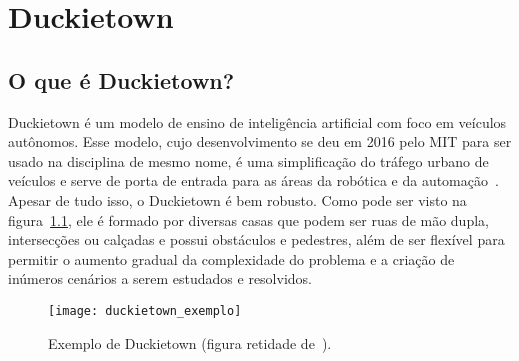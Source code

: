 

\chapter{Duckietown}
\label{cap:duckietown}

\section{O que é Duckietown?}
\label{sec:o-que-e-duckietown}

\enlargethispage{.5\baselineskip}

Duckietown é um modelo de ensino de inteligência artificial com foco em veículos autônomos. Esse modelo, cujo desenvolvimento se deu em 2016 pelo MIT para ser usado na disciplina de mesmo nome, é uma simplificação do tráfego urbano de veículos e serve de porta de entrada para as áreas da robótica e da automação~\citep{duckietown-historia}. Apesar de tudo isso, o Duckietown é bem robusto. Como pode ser visto na figura~\ref{fig:duckietown_exemplo}, ele é formado por diversas casas que podem ser ruas de mão dupla, intersecções ou calçadas e possui obstáculos e pedestres, além de ser flexível para permitir o aumento gradual da complexidade do problema e a criação de inúmeros cenários a serem estudados e resolvidos.

\begin{figure}
	\centering
	\texttt{[image: duckietown\_exemplo]}
	\caption{Exemplo de Duckietown (figura retidade de~\citep{duckietown-guia}).\label{fig:duckietown_exemplo}}
\end{figure}

